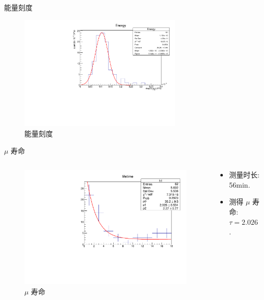 \documentclass[10pt]{beamer}
\begin{document}
\begin{frame}[label={sec:org8795592}]{能量刻度}
\begin{figure}[htbp]
\centering
\includegraphics[width=0.7\textwidth]{../../DetectorPerform/ECali/qqdist.pdf}
\caption{能量刻度}
\end{figure}
\end{frame}

\begin{frame}[label={sec:orgf789805}]{\(\mu\) 寿命}
\begin{columns}
\begin{column}{0.5\columnwidth}
\begin{figure}[htbp]
\centering
\includegraphics[width=1.0\textwidth]{../../img/lifeTimeHist.pdf}
\caption{\(\mu\) 寿命}
\end{figure}
\end{column}

\begin{column}{0.5\columnwidth}
\begin{itemize}
\item 测量时长: 56min.
\item 测得 \(\mu\) 寿命: \(\tau = 2.026 \pm \qty{0.534}{\mu s}\).
\end{itemize}
\end{column}
\end{columns}
\end{frame}
\end{document}
